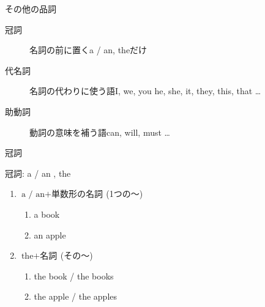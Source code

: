 \documentclass[aspectratio=169,xcolor={dvipsnames,table}]{beamer}
\begin{document}
\begin{frame}[plain]{その他の品詞}
 \begin{description}
  \item[冠詞]  名詞の前に置く\hfill{}a / an, theだけ
  \item[代名詞] 名詞の代わりに使う語\hfill{}I, we, you he, she, it, they, this, that \dots
  \item[助動詞] 動詞の意味を補う語\hfill{}can, will, must \ldots 
 \end{description}
\end{frame}
\begin{frame}[plain]{冠詞}
\Large

冠詞: a / an , the

 \begin{enumerate}
  \item $\text{a / an} + \text{単数形の名詞}$\,(1つの～)
	\begin{enumerate}
	 \item a book\hfill\textipa{/\textschwa /}
	 \item an apple\hfill{}
	\end{enumerate}
  \item $\text{the} + \text{名詞}$\,(その～)\hspace{10pt}{\small (単数形・複数形どちらにもつく)}
	\begin{enumerate}
	 \item the book / the books\hfill\textipa{/\dh\textschwa/}
	 \item the apple / the apples\hfill{}
	\end{enumerate}
 \end{enumerate}
\mbox{}\hfill{\scriptsize {}}
\end{frame}
\end{document}
